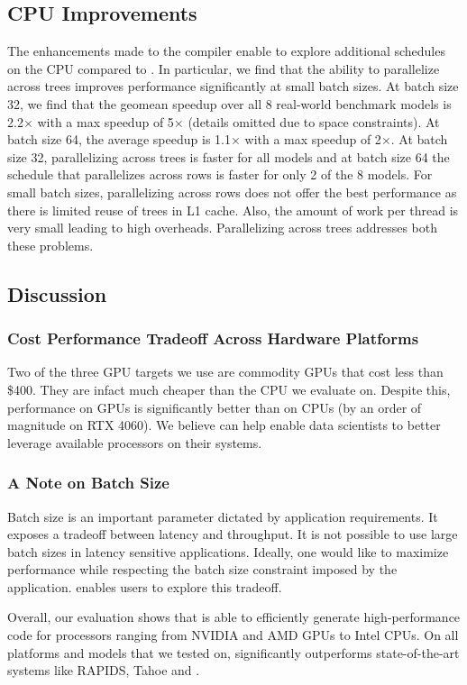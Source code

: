 \subsection{CPU Improvements}
The enhancements made to the compiler enable \Treebeard{} to explore additional schedules on the CPU
compared to \TreebeardOLD{}. 
In particular, we find that the ability to parallelize across trees improves performance 
significantly at small batch sizes. At batch size 32, we find that the geomean speedup over 
all 8 real-world benchmark models is 2.2$\times$ with a max speedup of 5$\times$ (details omitted 
due to space constraints). At batch size 64, the average speedup
is 1.1$\times$ with a max speedup of 2$\times$. At batch size 32, parallelizing across trees is faster 
for all models and at batch size 64 the \TreebeardOLD{} schedule that parallelizes across 
rows is faster for only 2 of the 8 models. For small batch sizes, parallelizing across rows does 
not offer the best performance as there is limited reuse of trees in L1 cache.
Also, the amount of work per thread is very small leading to high overheads. 
Parallelizing across trees addresses both these problems. 

\subsection{Discussion}
\subsubsection*{Cost Performance Tradeoff Across Hardware Platforms}
Two of the three GPU targets we use are commodity GPUs that cost less than \$400. They 
are infact much cheaper than the CPU we evaluate on. Despite this, performance on GPUs
is significantly better than on CPUs (by an order of magnitude on RTX 4060).
We believe \Treebeard{} can help enable data scientists to better leverage 
available processors on their systems.

\subsubsection*{A Note on Batch Size}
Batch size is an important parameter dictated by application requirements. It 
exposes a tradeoff between latency and throughput. It is not possible to use 
large batch sizes in latency sensitive applications. Ideally, one would like 
to maximize performance while respecting the batch size constraint imposed 
by the application. \Treebeard{} enables users to explore this tradeoff.  

Overall, our evaluation shows that \Treebeard{} is able to efficiently generate 
high-performance code for processors ranging from NVIDIA and AMD GPUs to Intel CPUs.
On all platforms and models that we tested on, \Treebeard{} significantly outperforms
state-of-the-art systems like RAPIDS, Tahoe and \TreebeardOLD{}.
